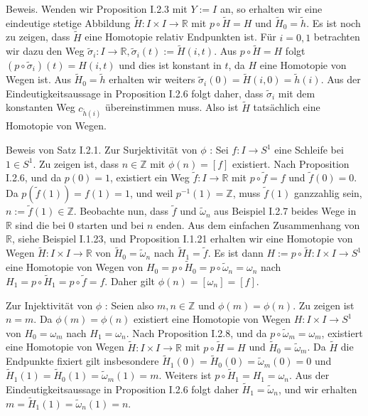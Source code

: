 \documentclass[10pt]{article}
\begin{document}
Beweis. Wenden wir Proposition I.2.3 mit $Y:=I$ an, so erhalten wir eine eindeutige stetige Abbildung $\tilde{H}: I \times I \rightarrow \mathbb{R}$ mit $p \circ \tilde{H}=H$ und $\tilde{H}_{0}=\tilde{h}$. Es ist noch zu zeigen, dass $\tilde{H}$ eine Homotopie relativ Endpunkten ist. Für $i=0,1$ betrachten wir dazu den Weg $\tilde{\sigma}_{i}: I \rightarrow \mathbb{R}, \tilde{\sigma}_{i}(t):=\tilde{H}(i, t)$. Aus $p \circ \tilde{H}=H$ folgt $\left(p \circ \tilde{\sigma}_{i}\right)(t)=H(i, t)$ und dies ist konstant in $t$, da $H$ eine Homotopie von Wegen ist. Aus $\tilde{H}_{0}=\tilde{h}$ erhalten wir weiters $\tilde{\sigma}_{i}(0)=\tilde{H}(i, 0)=\tilde{h}(i)$. Aus der Eindeutigkeitsaussage in Proposition I.2.6 folgt daher, dass $\tilde{\sigma}_{i}$ mit dem konstanten Weg $c_{\tilde{h}(i)}$ übereinstimmen muss. Also ist $\tilde{H}$ tatsächlich eine Homotopie von Wegen.

Beweis von Satz I.2.1. Zur Surjektivität von $\phi$ : Sei $f: I \rightarrow S^{1}$ eine Schleife bei $1 \in S^{1}$. Zu zeigen ist, dass $n \in \mathbb{Z}$ mit $\phi(n)=[f]$ existiert. Nach Proposition I.2.6, und da $p(0)=1$, existiert ein Weg $\tilde{f}: I \rightarrow \mathbb{R}$ mit $p \circ \tilde{f}=f$ und $\tilde{f}(0)=0$. Da $p(\tilde{f}(1))=f(1)=1$, und weil $p^{-1}(1)=\mathbb{Z}$, muss $\tilde{f}(1)$ ganzzahlig sein, $n:=\tilde{f}(1) \in \mathbb{Z}$. Beobachte nun, dass $\tilde{f}$ und $\tilde{\omega}_{n}$ aus Beispiel I.2.7 beides Wege in $\mathbb{R}$ sind die bei 0 starten und bei $n$ enden. Aus dem einfachen Zusammenhang von $\mathbb{R}$, siehe Beispiel I.1.23, und Proposition I.1.21 erhalten wir eine Homotopie von Wegen $\tilde{H}: I \times I \rightarrow \mathbb{R}$ von $\tilde{H}_{0}=\tilde{\omega}_{n}$ nach $\tilde{H}_{1}=\tilde{f}$. Es ist dann $H:=p \circ \tilde{H}: I \times I \rightarrow S^{1}$ eine Homotopie von Wegen von $H_{0}=p \circ \tilde{H}_{0}=p \circ \tilde{\omega}_{n}=\omega_{n}$ nach $H_{1}=p \circ \tilde{H}_{1}=p \circ \tilde{f}=f$. Daher gilt $\phi(n)=\left[\omega_{n}\right]=[f]$.

Zur Injektivität von $\phi$ : Seien also $m, n \in \mathbb{Z}$ und $\phi(m)=\phi(n)$. Zu zeigen ist $n=m$. Da $\phi(m)=\phi(n)$ existiert eine Homotopie von Wegen $H: I \times I \rightarrow S^{1}$ von $H_{0}=\omega_{m}$ nach $H_{1}=\omega_{n}$. Nach Proposition I.2.8, und da $p \circ \tilde{\omega}_{m}=\omega_{m}$, existiert eine Homotopie von Wegen $\tilde{H}: I \times I \rightarrow \mathbb{R}$ mit $p \circ \tilde{H}=H$ und $\tilde{H}_{0}=\tilde{\omega}_{m}$. Da $\tilde{H}$ die Endpunkte fixiert gilt insbesondere $\tilde{H}_{1}(0)=\tilde{H}_{0}(0)=\tilde{\omega}_{m}(0)=0$ und $\tilde{H}_{1}(1)=\tilde{H}_{0}(1)=\tilde{\omega}_{m}(1)=m$. Weiters ist $p \circ \tilde{H}_{1}=H_{1}=\omega_{n}$. Aus der Eindeutigkeitsaussage in Proposition I.2.6 folgt daher $\tilde{H}_{1}=\tilde{\omega}_{n}$, und wir erhalten $m=\tilde{H}_{1}(1)=\tilde{\omega}_{n}(1)=n$.
\end{document}
